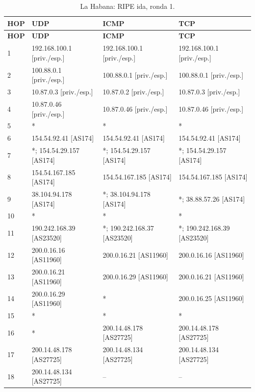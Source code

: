 \begingroup
\fontsize{9}{11}\selectfont
\begin{longtable}{p{0.95cm}p{4.716666666666667cm}p{4.716666666666667cm}p{4.716666666666667cm}}
\caption{La Habana: RIPE ida, ronda 1.}\label{anexo:ripe:200.14.48.134:1} \\
\toprule
\textbf{HOP} & \textbf{UDP} & \textbf{ICMP} & \textbf{TCP} \\ \midrule
\endfirsthead
\toprule
\textbf{HOP} & \textbf{UDP} & \textbf{ICMP} & \textbf{TCP} \\ \midrule
\endhead
1 & 192.168.100.1 [priv./esp.] & 192.168.100.1 [priv./esp.] & 192.168.100.1 [priv./esp.] \\
2 & 100.88.0.1 [priv./esp.] & 100.88.0.1 [priv./esp.] & 100.88.0.1 [priv./esp.] \\
3 & 10.87.0.3 [priv./esp.] & 10.87.0.2 [priv./esp.] & 10.87.0.3 [priv./esp.] \\
4 & 10.87.0.46 [priv./esp.] & 10.87.0.46 [priv./esp.] & 10.87.0.46 [priv./esp.] \\
5 & * & * & * \\
6 & 154.54.92.41 [AS174] & 154.54.92.41 [AS174] & 154.54.92.41 [AS174] \\
7 & *; 154.54.29.157 [AS174] & *; 154.54.29.157 [AS174] & *; 154.54.29.157 [AS174] \\
8 & 154.54.167.185 [AS174] & 154.54.167.185 [AS174] & 154.54.167.185 [AS174] \\
9 & 38.104.94.178 [AS174] & *; 38.104.94.178 [AS174] & *; 38.88.57.26 [AS174] \\
10 & * & * & * \\
11 & 190.242.168.39 [AS23520] & *; 190.242.168.37 [AS23520] & *; 190.242.168.39 [AS23520] \\
12 & 200.0.16.16 [AS11960] & 200.0.16.21 [AS11960] & 200.0.16.16 [AS11960] \\
13 & 200.0.16.21 [AS11960] & 200.0.16.29 [AS11960] & 200.0.16.21 [AS11960] \\
14 & 200.0.16.29 [AS11960] & * & 200.0.16.25 [AS11960] \\
15 & * & * & * \\
16 & * & 200.14.48.178 [AS27725] & 200.14.48.178 [AS27725] \\
17 & 200.14.48.178 [AS27725] & 200.14.48.134 [AS27725] & 200.14.48.134 [AS27725] \\
18 & 200.14.48.134 [AS27725] & -- & -- \\
\bottomrule
\end{longtable}
\endgroup
\begingroup
\fontsize{9}{11}\selectfont
